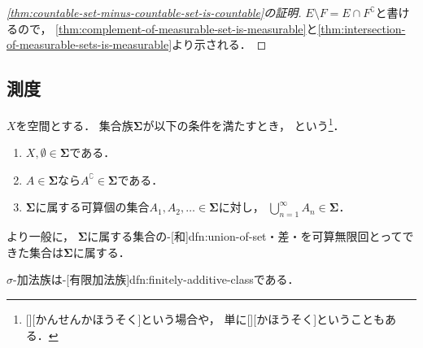 \documentclass[../sotsu.tex]{subfiles}
\begin{document}
\begin{proof}[\cref{thm:countable-set-minus-countable-set-is-countable}の証明]
    $E \setminus F = E \cap F^{\complement}$と書けるので，
    \cref{thm:complement-of-measurable-set-is-measurable}と\cref{thm:intersection-of-measurable-sets-is-measurable}より示される．
\end{proof}



\subsection{測度}

\begin{definition}
    \label{dfn:sigma-additive-class}
    $X$を空間とする．
    集合族$𝚺$が以下の条件を満たすとき，
    という\footnote{
        [][かんせんかほうそく]という場合や，
        単に[][かほうそく]ということもある．
    }．
    \begin{enumerate}
        \item $X, \emptyset \in 𝚺$である．
        \item $A \in 𝚺$なら$A^{\complement} \in 𝚺$である．
        \item $𝚺$に属する可算個の集合$A_1, A_2, \dotsc \in 𝚺$に対し，
            \(  \bigcup_{n=1}^{\infty} A_n  \in  𝚺  \)．
    \end{enumerate}
    より一般に，
    $𝚺$に属する集合の-[和]{dfn:union-of-set}・差・を可算無限回とってできた集合は$𝚺$に属する．
\end{definition}

$\sigma$-加法族は-[有限加法族]{dfn:finitely-additive-class}である．
\end{document}
